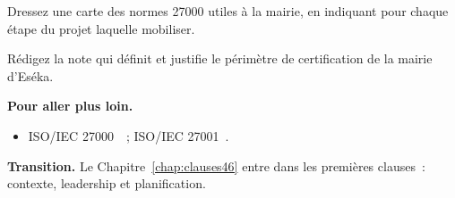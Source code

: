 \begin{boxexo}[title={\ding{45}\quad Exercice~7.9. Carte des normes \niveauexpert}]
Dressez une carte des normes 27000 utiles à la mairie, en indiquant pour chaque
étape du projet laquelle mobiliser.
\end{boxexo}

\begin{boxexo}[title={\ding{45}\quad Exercice~7.10. Note de périmètre \niveauexpert}]
Rédigez la note qui définit et justifie le périmètre de certification de la
mairie d'Eséka.
\end{boxexo}

\bigskip

\begin{boxinfo}
\textbf{Pour aller plus loin.}
\begin{itemize}
    \item ISO/IEC 27000~\cite{iso27000}~; ISO/IEC 27001~\cite{iso27001}.
\end{itemize}
\end{boxinfo}

\begin{boxinfo}
\textbf{Transition.} Le Chapitre~\ref{chap:clauses46} entre dans les premières
clauses~: contexte, leadership et planification.
\end{boxinfo}
